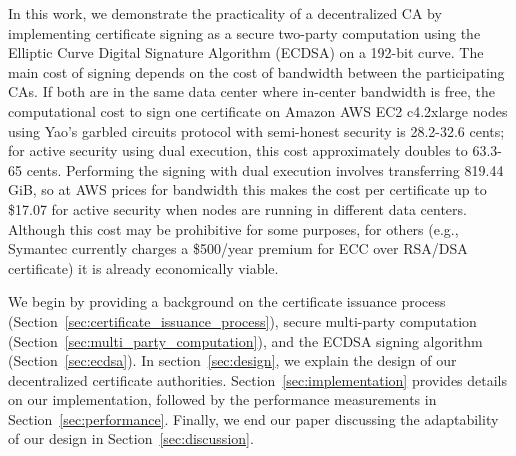 In this work, we demonstrate the practicality of a decentralized CA by implementing certificate signing as a secure two-party computation using the Elliptic Curve Digital Signature Algorithm (ECDSA) on a 192-bit curve. The main cost of signing depends on the cost of bandwidth between the participating CAs. If both are in the same data center where in-center bandwidth is free, the computational cost to sign one certificate on Amazon AWS EC2 c4.2xlarge nodes using Yao's garbled circuits protocol with semi-honest security is 28.2-32.6 cents; for active security using dual execution, this cost approximately doubles to 63.3-65 cents. Performing the signing with dual execution involves transferring 819.44 GiB, so at AWS prices for bandwidth this makes the cost per certificate up to \$17.07 for active security when nodes are running in different data centers.  Although this cost may be prohibitive for some purposes, for others (e.g., Symantec currently charges a \$500/year premium for ECC over RSA/DSA certificate) it is already economically viable.

 We begin by providing a background on the certificate issuance process (Section~\ref{sec:certificate_issuance_process}), secure multi-party computation (Section~\ref{sec:multi_party_computation}), and the ECDSA signing algorithm (Section~\ref{sec:ecdsa}). In section~\ref{sec:design}, we explain the design of our decentralized certificate authorities. Section~\ref{sec:implementation} provides details on our implementation, followed by the performance measurements in Section~\ref{sec:performance}. Finally, we end our paper discussing the adaptability of our design in Section~\ref{sec:discussion}.